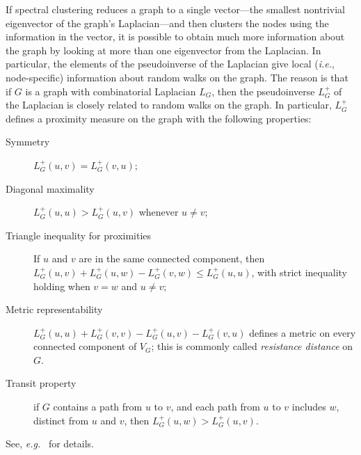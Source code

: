 \documentclass[12pt]{article}
\theoremstyle{plain}
\begin{document}
If spectral clustering reduces a graph to a single vector---the smallest
nontrivial eigenvector of the graph's Laplacian---and then clusters the 
nodes using the information in the vector, it is possible to obtain much 
more information about the graph by looking at more than one eigenvector 
from the Laplacian.  
In particular, the elements of the pseudoinverse of the Laplacian give 
local (\emph{i.e.}, node-specific) information about random
walks on the graph.
The reason is that if $G$ is a graph with combinatorial Laplacian $L_G$, 
then the pseudoinverse $L_G^+$  of the Laplacian is closely related to 
random walks on the graph.  
In particular, $L_{G}^{+}$ defines a proximity measure on the graph with the
following properties:
\begin{description}
  \item[Symmetry]
    $L_G^{+}(u,v) = L_G^{+}(v,u)$;
 \item[Diagonal maximality]
    $L_G^{+}(u,u) > L_G^{+} (u,v)$ whenever $u \neq v$;
  \item[Triangle inequality for proximities]
    If $u$ and $v$ are in the same connected component, then
    $L_G^{+} (u,v) + L_G^{+} (u,w) - L_G^{+} (v,w) \leq L_G^{+} (u,u)$, with strict inequality
    holding when $v = w$ and $u \neq v$;
  \item[Metric representability]
   $L_G^{+} (u,u) + L_G^{+} (v,v) - L_G^{+} (u,v) - L_G^{+} (v,u)$
    defines a metric on every connected component of $V_G$;  this is commonly called
    \emph{resistance distance} on $G$.
 \item[Transit property]
    if $G$ contains a path from $u$ to $v$, and each path from $u$ to
    $v$ includes $w$, distinct from $u$ and $v$, then $L_G^{+}(u,w) >
    L_G^{+}(u,v)$.
\end{description}
See, \emph{e.g.}~\cite{chebotarev1998proximity} for details.  
\end{document}
